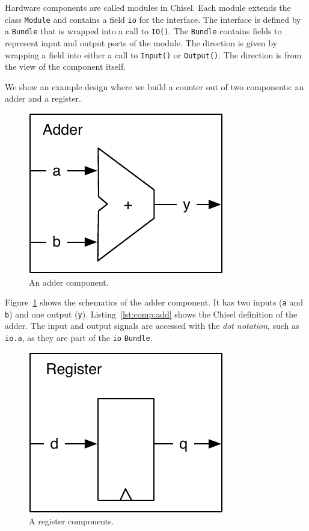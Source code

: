 \documentclass[%
    10pt,
    headinclude, footexclude,
    openright, %
    notitlepage,
    cleardoubleempty,
    headsepline,
    pointlessnumbers,
    bibtotoc, idxtotoc,
    ]{scrbook}
\newcommand{\code}[1]{{\small{\texttt{#1}}}}
\newcommand{\scale}{0.7}
\begin{document}

Hardware components are called modules in Chisel. Each module extends
the class \code{Module} and contains a field \code{io} for the interface.
The interface is defined by a \code{Bundle} that is wrapped into a call to \code{IO()}.
The \code{Bundle} contains fields to represent input and output ports of
the module. The direction is given by wrapping a field into either a call to \code{Input()}
or \code{Output()}. The direction is from the view of the component itself.

We show an example design where we build a counter out of two components:
an adder and a register.

\begin{figure}
  \centering
  \includegraphics[scale=\scale]{figures/components-adder}
  \caption{An adder component.}
  \label{fig:components-adder}
\end{figure}


Figure~\ref{fig:components-adder} shows the schematics of the adder component.
It has two inputs (\code{a} and \code{b}) and one output (\code{y}).
Listing~\ref{lst:comp:add} shows the Chisel definition of the adder.
The input and output signals are accessed with
the \emph{dot notation}, such as \code{io.a}, as they are part of the \code{io}
\code{Bundle}.

\begin{figure}
  \centering
  \includegraphics[scale=\scale]{figures/components-register}
  \caption{A register components.}
  \label{fig:components-register}
\end{figure}
\end{document}
